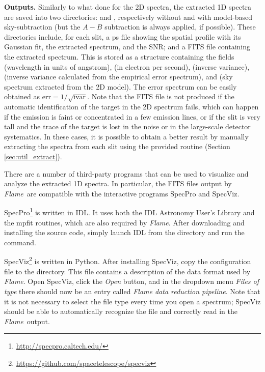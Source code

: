 \documentclass[a4paper]{article}
\newcommand{\flame}{\emph{Flame}}
\begin{document}
\begin{sloppypar}
\medskip
\noindent
\textbf{Outputs.} Similarly to what done for the 2D spectra, the extracted 1D spectra are saved into two directories:  and , respectively without and with model-based sky-subtraction (but the $A-B$ subtraction is always applied, if possible). These directories include, for each slit, a ps file showing the spatial profile with its Gaussian fit, the extracted spectrum, and the SNR; and a FITS file containing the extracted spectrum. This is stored as a structure containing the fields  (wavelength in units of angstrom),  (in electron per second),  (inverse variance),  (inverse variance calculated from the empirical error spectrum), and  (sky spectrum extracted from the 2D model). The error spectrum can be easily obtained as $\mathrm{err} = 1/\sqrt{\mathrm{ivar}}$. Note that the FITS file is not produced if the automatic identification of the target in the 2D spectrum fails, which can happen if the emission is faint or concentrated in a few emission lines, or if the slit is very tall and the trace of the target is lost in the noise or in the large-scale detector systematics. In these cases, it is possible to obtain a better result by manually extracting the spectra from each slit using the provided  routine (Section \ref{sec:util_extract}).

There are a number of third-party programs that can be used to visualize and analyze the extracted 1D spectra. In particular, the FITS files output by \flame\ are compatible with the interactive programs SpecPro and SpecViz.

SpecPro\footnote{\url{http://specpro.caltech.edu/}} is written in IDL. It uses both the IDL Astronomy User's Library and the mpfit routines, which are also required by \flame. After downloading and installing the source code, simply launch IDL from the  directory and run the  command.

SpecViz\footnote{\url{https://github.com/spacetelescope/specviz}} is written in Python. After installing SpecViz, copy the configuration file  to the  directory. This file contains a description of the data format used by \flame. Open SpecViz, click the \emph{Open} button, and in the dropdown menu \emph{Files of type} there should now be an entry called \emph{Flame data reduction pipeline}. Note that it is not necessary to select the file type every time you open a spectrum; SpecViz should be able to automatically recognize the file and correctly read in the \flame\ output.



\end{sloppypar}
\end{document}
